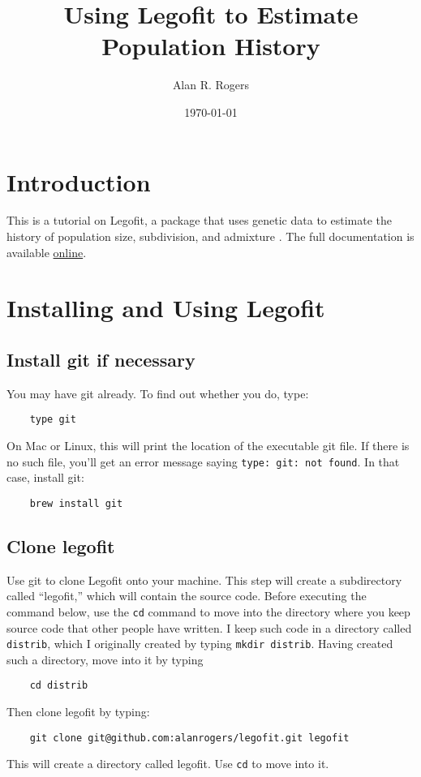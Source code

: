 \documentclass[11pt]{article}
\begin{document}
\title{Using Legofit to Estimate Population History}
\author{Alan R. Rogers}
\date{\today}
\maketitle

\section{Introduction}
This is a tutorial on Legofit, a package that uses genetic data to
estimate the history of population size, subdivision, and admixture
\citep{Rogers:BMC-20-526, Rogers:PCJ-2-e32}. The full documentation is
available
\href{http://alanrogers.github.io/legofit/html/index.html}{online}.

\section{Installing and Using Legofit}

\subsection{Install git if necessary}

You may have git already. To find out whether you do, type:
\begin{verbatim}
    type git
\end{verbatim}
On Mac or Linux, this will print the location of the executable git
file. If there is no such file, you'll get an error message saying
\texttt{type: git: not found}. In that case, install git:
\begin{verbatim}
    brew install git
\end{verbatim}

\subsection{Clone legofit}
Use git to clone Legofit onto your machine. This step will create a
subdirectory called ``legofit,'' which will contain the source
code. Before executing the command below, use the \texttt{cd} command
to move into the directory where you keep source code that other
people have written. I keep such code in a directory called
\texttt{distrib}, which I originally created by typing \texttt{mkdir
  distrib}. Having created such a directory, move into it by typing
\begin{verbatim}
    cd distrib
\end{verbatim}
Then clone legofit by typing:
\begin{verbatim}
    git clone git@github.com:alanrogers/legofit.git legofit
\end{verbatim}
This will create a directory called legofit. Use \texttt{cd} to move into it.
\end{document}
